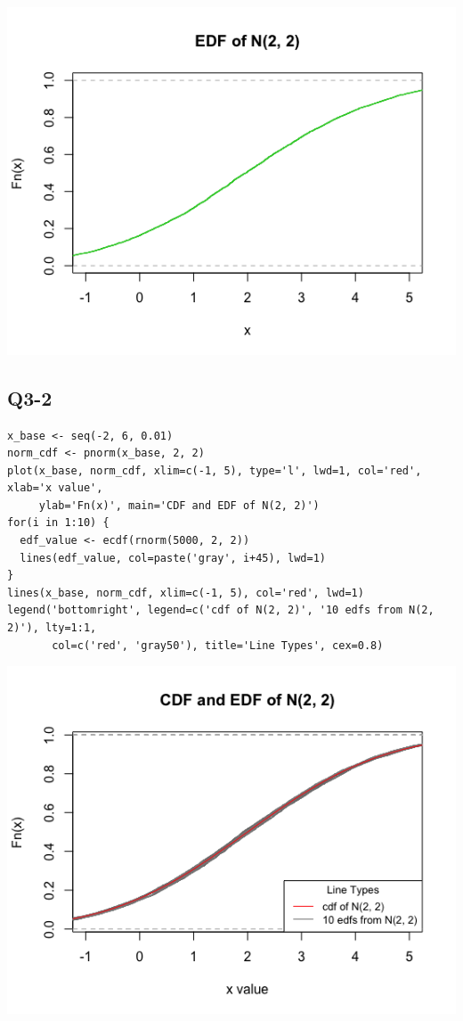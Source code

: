 \documentclass[12pt,letterpaper]{article}
\begin{document}
\includegraphics[width=150mm]{plot_norm_edf.png}

\pagebreak
\subsection*{Q3-2}
\begin{verbatim}
x_base <- seq(-2, 6, 0.01)
norm_cdf <- pnorm(x_base, 2, 2)
plot(x_base, norm_cdf, xlim=c(-1, 5), type='l', lwd=1, col='red', xlab='x value',
     ylab='Fn(x)', main='CDF and EDF of N(2, 2)')
for(i in 1:10) {
  edf_value <- ecdf(rnorm(5000, 2, 2))
  lines(edf_value, col=paste('gray', i+45), lwd=1)
}
lines(x_base, norm_cdf, xlim=c(-1, 5), col='red', lwd=1)
legend('bottomright', legend=c('cdf of N(2, 2)', '10 edfs from N(2, 2)'), lty=1:1, 
       col=c('red', 'gray50'), title='Line Types', cex=0.8)
\end{verbatim}

\includegraphics[width=150mm]{plot_edf_cdf.png}
\end{document}
